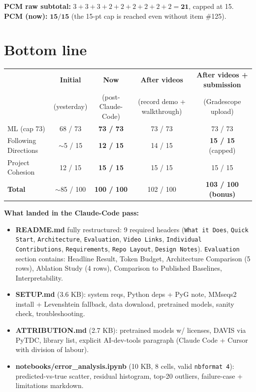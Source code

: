 \documentclass[11pt]{article}
\begin{document}
\noindent\textbf{PCM raw subtotal:} $3+3+3+2+2+2+2+2+2 = \mathbf{21}$, capped at 15. \quad
\textbf{PCM (now):} $\mathbf{15/15}$ (the 15-pt cap is reached even without item \#125).

\section*{Bottom line}

\begin{tabular}{@{}lcccc@{}}
\toprule
& \textbf{Initial} & \textbf{Now} & \textbf{After videos} & \textbf{After videos + submission} \\
& \scriptsize (yesterday) & \scriptsize (post-Claude-Code) & \scriptsize (record demo + walkthrough) & \scriptsize (Gradescope upload) \\
\midrule
ML (cap 73)          & 68 / 73  & \textbf{73 / 73}  & 73 / 73  & 73 / 73 \\
Following Directions & $\sim$5 / 15  & \textbf{12 / 15}  & 14 / 15  & \textbf{15 / 15} (capped) \\
Project Cohesion     & 12 / 15  & \textbf{15 / 15}  & 15 / 15  & 15 / 15 \\
\midrule
\textbf{Total}       & $\sim$85 / 100 & \textbf{100 / 100} & 102 / 100 & \textbf{103 / 100 (bonus)} \\
\bottomrule
\end{tabular}

\medskip
\noindent\textbf{What landed in the Claude-Code pass:}
\begin{itemize}
\item \textbf{README.md} fully restructured: 9 required headers (\texttt{What it Does}, \texttt{Quick Start}, \texttt{Architecture}, \texttt{Evaluation}, \texttt{Video Links}, \texttt{Individual Contributions}, \texttt{Requirements}, \texttt{Repo Layout}, \texttt{Design Notes}). \texttt{Evaluation} section contains: Headline Result, Token Budget, Architecture Comparison (5 rows), Ablation Study (4 rows), Comparison to Published Baselines, Interpretability.
\item \textbf{SETUP.md} (3.6 KB): system reqs, Python deps + PyG note, MMseqs2 install + Levenshtein fallback, data download, pretrained models, sanity check, troubleshooting.
\item \textbf{ATTRIBUTION.md} (2.7 KB): pretrained models w/ licenses, DAVIS via PyTDC, library list, explicit AI-dev-tools paragraph (Claude Code + Cursor with division of labour).
\item \textbf{notebooks/error\_analysis.ipynb} (10 KB, 8 cells, valid \texttt{nbformat 4}): predicted-vs-true scatter, residual histogram, top-20 outliers, failure-case + limitations markdown.
\end{itemize}
\end{document}
